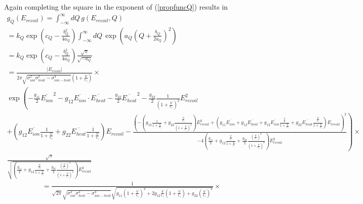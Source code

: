 \begin{landscape}
Again completing the square in the exponent of (\ref{propfuncQ}) results in
\begin{gather}
g_Q(E_{recoil}) = \int_{-\infty}^{\infty} dQ \, g(E_{recoil},Q) \\
= k_Q \exp \left( c_Q - \frac{b_Q^2}{4 a_Q} \right) \int_{-\infty}^{\infty} dQ \, \exp \left( a_Q \left( Q + \frac{b_Q}{2 a_Q} \right)^2 \right) \\
= k_Q \exp \left( c_Q - \frac{b_Q^2}{4 a_Q} \right) \frac{\sqrt{\pi}}{ \sqrt{-a_Q}} \\
= \frac{\left| E_{recoil} \right| }{2 \pi \sqrt{\sigma_{ion}^2 \sigma_{heat}^2 - \sigma_{ion-heat}^4} \left(1 + \frac{V}{\epsilon_\gamma}\right)} \times \\
\exp \left(-\frac{g_{11}}{2} \overline{E_{ion}}^2 - g_{12} \overline{E_{ion}} \cdot \overline{E_{heat}} - \frac{g_{22}}{2} \overline{E_{heat}}^2 - \frac{g_{22}}{2} \frac{1}{\left(1 + \frac{V}{\epsilon_\gamma} \right)^2} E_{recoil}^2 \right.\\
\left. + \left( g_{12} \overline{E_{ion}} \frac{1}{1+ \frac{V}{\epsilon_\gamma}} 
+ g_{22} \overline{E_{heat}} \frac{1}{1 + \frac{V}{\epsilon_\gamma}} \right) E_{recoil} - \frac{\left(- \left( g_{12} \frac{1}{1 + \frac{V}{\epsilon_\gamma}}
+ g_{22} \frac{\frac{V}{\epsilon_\gamma}}{\left(1 + \frac{V}{\epsilon_\gamma} \right)^2} \right) E_{recoil}^2 + \left(g_{11} \overline{E_{ion}} + g_{12} \overline{E_{heat}}  + g_{12} \overline{E_{ion}} \frac{\frac{V}{\epsilon}}{1+ \frac{V}{\epsilon_\gamma}}  + g_{22} \overline{E_{heat}} \frac{\frac{V}{\epsilon_\gamma}}{1+ \frac{V}{\epsilon_\gamma}} \right) E_{recoil} \right)^2}{-4 \left( \frac{g_{11}}{2} + g_{12} \frac{\frac{V}{\epsilon_\gamma}}{1+ \frac{V}{\epsilon_\gamma}} + \frac{g_{22}}{2} \frac{ \left( \frac{V}{\epsilon_\gamma} \right)^2}{\left( 1 + \frac{V}{\epsilon_\gamma} \right)^2} \right) E_{recoil}^2 } \right) \times \\
\frac{\sqrt{\pi}}{ \sqrt{\left( \frac{g_{11}}{2} + g_{12} \frac{\frac{V}{\epsilon_\gamma}}{1+ \frac{V}{\epsilon_\gamma}} + \frac{g_{22}}{2} \frac{ \left( \frac{V}{\epsilon_\gamma} \right)^2}{\left( 1 + \frac{V}{\epsilon_\gamma} \right)^2} \right) E_{recoil}^2}}
\end{gather}
\newpage
\begin{gather}
= \frac{1 }{\sqrt{2 \pi} \sqrt{\sigma_{ion}^2 \sigma_{heat}^2 - \sigma_{ion-heat}^4} \sqrt{g_{11} \left(1 + \frac{V}{\epsilon_\gamma} \right)^2 + 2 g_{12} \frac{V}{\epsilon_\gamma} \left( 1+ \frac{V}{\epsilon_\gamma} \right) + g_{22}  \left( \frac{V}{\epsilon_\gamma} \right)^2}} \times \\

\end{gather}
\end{landscape}
